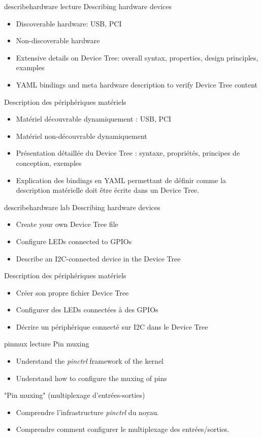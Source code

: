 {describehardware}
{lecture}
{Describing hardware devices}
{
  \begin{itemize}
  \item Discoverable hardware: USB, PCI
  \item Non-discoverable hardware
  \item Extensive details on Device Tree: overall syntax, properties,
    design principles, examples
  \item YAML bindings and meta hardware description to verify Device Tree
    content
  \end{itemize}
}
{Description des périphériques matériels}
{
  \begin{itemize}
  \item Matériel découvrable dynamiquement : USB, PCI
  \item Matériel non-découvrable dynamiquement
  \item Présentation détaillée du Device Tree : syntaxe, propriétés,
    principes de conception, exemples
  \item Explication des bindings en YAML permettant de définir comme la
    description matérielle doit être écrite dans un Device Tree.
  \end{itemize}
}
{describehardware}
{lab}
{Describing hardware devices}
{
  \begin{itemize}
  \item Create your own Device Tree file
  \item Configure LEDs connected to GPIOs
  \item Describe an I2C-connected device in the Device Tree
  \end{itemize}
}
{Description des périphériques matériels}
{
  \begin{itemize}
  \item Créer son propre fichier Device Tree
  \item Configurer des LEDs connectées à des GPIOs
  \item Décrire un périphérique connecté sur I2C dans le Device Tree
  \end{itemize}
}
{pinmux}
{lecture}
{Pin muxing}
{
  \begin{itemize}
  \item Understand the {\em pinctrl} framework of the kernel
  \item Understand how to configure the muxing of pins
  \end{itemize}
}
{"Pin muxing" (multiplexage d'entrées-sorties)}
{
  \begin{itemize}
  \item Comprendre l'infrastructure {\em pinctrl} du noyau.
  \item Comprendre comment configurer le multiplexage des
    entrées/sorties.
  \end{itemize}
}
